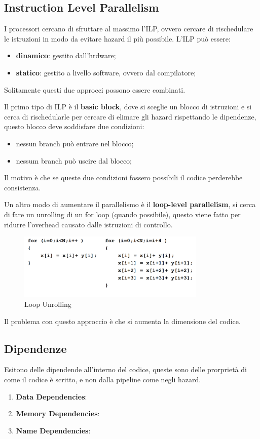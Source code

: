 \documentclass[12pt]{article}
\begin{document}
\subsection{Instruction Level Parallelism}
I processori cercano di sfruttare al massimo l'ILP, ovvero cercare di rischedulare le istruzioni in modo da evitare hazard il pi\`u possibile. L'ILP pu\`o essere:
\begin{itemize}
    \item \textbf{dinamico}: gestito dall'hrdware;
    \item \textbf{statico}: gestito a livello software, ovvero dal compilatore;
\end{itemize}
Solitamente questi due approcci possono essere combinati.

Il primo tipo di ILP \`e il \textbf{basic block}, dove si sceglie un blocco di istruzioni e si cerca di rischedularle per cercare di elimare gli hazard rispettando le dipendenze, questo blocco deve soddisfare due condizioni:
\begin{itemize}
    \item nessun branch pu\`o entrare nel blocco;
    \item nessum branch pu\`o uscire dal blocco;
\end{itemize}
Il motivo \`e che se queste due condizioni fossero possibili il codice perderebbe consistenza.

Un altro modo di aumentare il parallelismo \`e il \textbf{loop-level parallelism}, si cerca di fare un unrolling di un for loop (quando possibile), questo viene fatto per ridurre l'overhead causato dalle istruzioni di controllo.
\begin{figure}[H]
    \centering
    \includegraphics[width=0.8\textwidth]{loop-unrolling.png}
    \caption{Loop Unrolling}
    \label{fig:loop-unrolling}
\end{figure}
Il problema con questo approccio \`e che si aumenta la dimensione del codice.


\subsection{Dipendenze}
Esitono delle dipendende all'interno del codice, queste sono delle prorpriet\`a di come il codice \`e scritto, e non dalla pipeline come negli hazard.
\begin{enumerate}
    \item \textbf{Data Dependencies}: 
    \item \textbf{Memory Dependencies}:
    \item \textbf{Name Dependencies}:
\end{enumerate}
\end{document}
